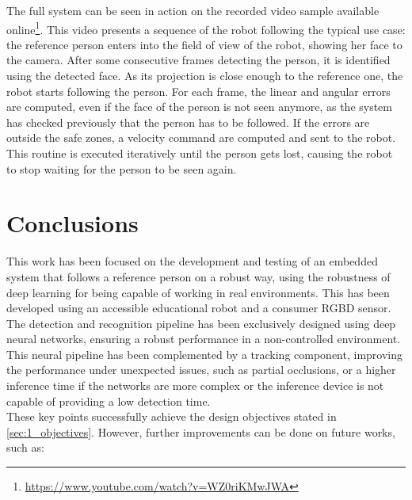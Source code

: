 The full system can be seen in action on the recorded video sample available online\footnote{\url{https://www.youtube.com/watch?v=WZ0riKMwJWA}}. This video presents a sequence of the robot following the typical use case: the reference person enters into the field of view of the robot, showing her face to the camera. After some consecutive frames detecting the person, it is identified using the detected face. As its projection is close enough to the reference one, the robot starts following the person. For each frame, the linear and angular errors are computed, even if the face of the person is not seen anymore, as the system has checked previously that the person has to be followed. If the errors are outside the safe zones, a velocity command are computed and sent to the robot. This routine is executed iteratively until the person gets lost, causing the robot to stop waiting for the person to be seen again.



\section{Conclusions}

This work has been focused on the development and testing of an embedded system that follows a reference person on a robust way, using the robustness of deep learning for being capable of working in real environments. This has been developed using an accessible educational robot and a consumer RGBD sensor.\\

The detection and recognition pipeline has been exclusively designed using deep neural networks, ensuring a robust performance in a non-controlled environment.\\

This neural pipeline has been complemented by a tracking component, improving the performance under unexpected issues, such as partial occlusions, or a higher inference time if the networks are more complex or the inference device is not capable of providing a low detection time.\\

These key points successfully achieve the design objectives stated in \autoref{sec:1_objectives}. However, further improvements can be done on future works, such as:


